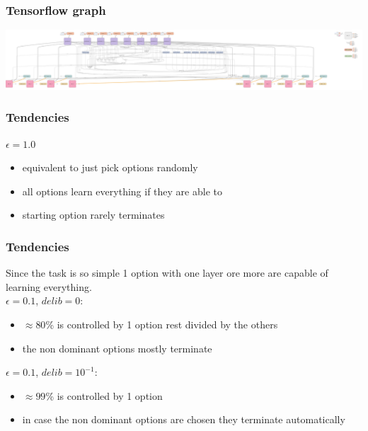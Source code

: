 \documentclass{beamer}
\begin{document}
\begin{frame}
\frametitle{Tensorflow graph}
\includegraphics[scale=0.035]{option_critic_graph_2.png}
\end{frame}


\begin{frame}
\frametitle{Tendencies}
\underline{$\epsilon = 1.0$} \pause
\begin{itemize}
\item equivalent to just pick options randomly \pause
\item all options learn everything if they are able to\pause
\item starting option rarely terminates
\end{itemize}
\end{frame}

\begin{frame}
\frametitle{Tendencies}
Since the task is so simple 1 option with one layer ore more are capable of learning everything.\\ %
\underline{$\epsilon = 0.1$}, \underline{$delib = 0$}: \pause
\begin{itemize}
\item $\approx 80$\% is controlled by 1 option rest divided by the others \pause
\item the non dominant options mostly terminate
\end{itemize} \pause
\underline{$\epsilon = 0.1$}, \underline{$delib = 10^{-1}$}: \pause
\begin{itemize}
\item $\approx 99$\% is controlled by 1 option \pause
\item in case the non dominant options are chosen they terminate automatically
\end{itemize} 
\end{frame}
\end{document}
